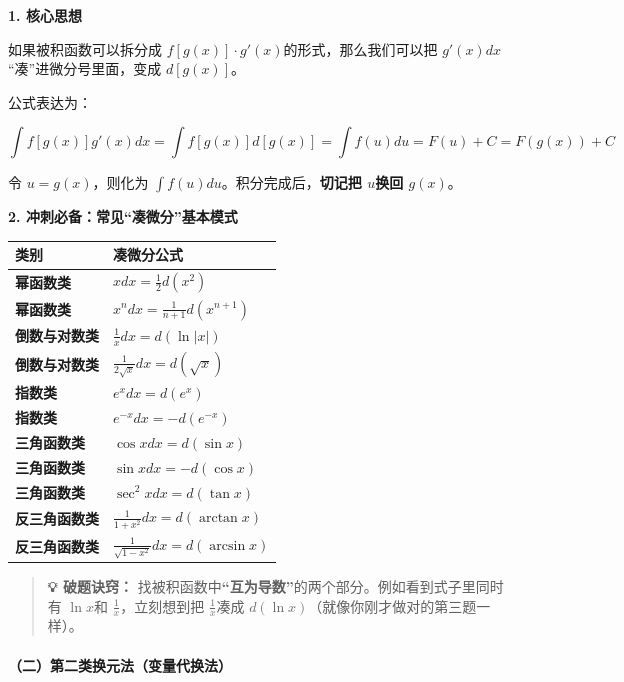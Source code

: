 \documentclass[
]{article}
\newcounter{none} %
\begin{document}
\textbf{1. 核心思想}

如果被积函数可以拆分成 \(f[g(x)] \cdot g'(x)\)的形式，那么我们可以把
\(g'(x)dx\)``凑''进微分号里面，变成 \(d[g(x)]\)。

公式表达为：

\[\int f[g(x)] g'(x) dx = \int f[g(x)] d[g(x)]=\int f(u)du=F(u)+C=F(g(x))+C\]

令 \(u = g(x)\)，则化为 \(\int f(u) du\)。积分完成后，\textbf{切记把
\(u\)换回 \(g(x)\)}。

\textbf{2. 冲刺必备：常见``凑微分''基本模式}

{\def\LTcaptype{none} %
\begin{longtable}[]{@{}ll@{}}
\toprule\noalign{}
\textbf{类别} & \textbf{凑微分公式} \\
\midrule\noalign{}
\endhead
\bottomrule\noalign{}
\endlastfoot
\textbf{幂函数类} & \(x dx = \frac{1}{2} d(x^2)\) \\
\textbf{幂函数类} & \(x^n dx = \frac{1}{n+1} d(x^{n+1})\) \\
\textbf{倒数与对数类} & \(\frac{1}{x} dx = d(\ln \lvert x \rvert)\) \\
\textbf{倒数与对数类} & \(\frac{1}{2\sqrt{x}} dx = d(\sqrt{x})\) \\
\textbf{指数类} & \(e^x dx = d(e^x)\) \\
\textbf{指数类} & \(e^{-x} dx = -d(e^{-x})\) \\
\textbf{三角函数类} & \(\cos x dx = d(\sin x)\) \\
\textbf{三角函数类} & \(\sin x dx = -d(\cos x)\) \\
\textbf{三角函数类} & \(\sec^2 x dx = d(\tan x)\) \\
\textbf{反三角函数类} & \(\frac{1}{1+x^2} dx = d(\arctan x)\) \\
\textbf{反三角函数类} & \(\frac{1}{\sqrt{1-x^2}} dx = d(\arcsin x)\) \\
\end{longtable}
}

\begin{quote}
\textbf{💡 破题诀窍：}
找被积函数中\textbf{``互为导数''}的两个部分。例如看到式子里同时有
\(\ln x\)和 \(\frac{1}{x}\)，立刻想到把 \(\frac{1}{x}\)凑成
\(d(\ln x)\)（就像你刚才做对的第三题一样）。
\end{quote}

\paragraph{（二）第二类换元法（变量代换法）}\label{ux4e8cuxff09ux7b2cux4e8cux7c7bux6362ux5143ux6cd5ux53d8ux91cfux4ee3ux6362ux6cd5uxff09}
\end{document}
